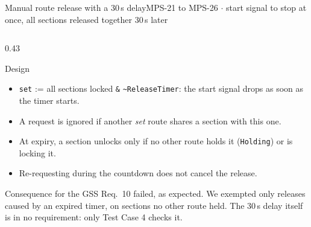 \documentclass[aspectratio=169,10pt]{beamer}
\newcommand{\smallfont}{\fontsize{7}{8.6}\selectfont}
\begin{document}
\begin{frame}{Manual route release with a 30\,s delay}{MPS-21 to MPS-26 $\cdot$ start signal to stop at once, all sections released together 30\,s later}
\begin{columns}[T]
    \begin{column}{0.43\textwidth}
      \begin{proverbox}{Design}
        \begin{itemize}\smallfont
          \item \texttt{set} := all sections locked \texttt{\&} \texttt{\textasciitilde ReleaseTimer}: the start signal drops as soon as the timer starts.
          \item A request is ignored if another \emph{set} route shares a section with this one.
          \item At expiry, a section unlocks only if no other route holds it (\texttt{Holding}) or is locking it.
          \item Re-requesting during the countdown does not cancel the release.
        \end{itemize}
      \end{proverbox}
      \vspace{-1mm}
      \begin{alertbox}{Consequence for the GSS}
        \smallfont
        Req.~10 failed, as expected. We exempted only releases caused by an expired timer, on sections no other route held. The 30\,s delay itself is in no requirement: only Test Case 4 checks it.
      \end{alertbox}
    \end{column}
  \end{columns}
\end{frame}
\end{document}
